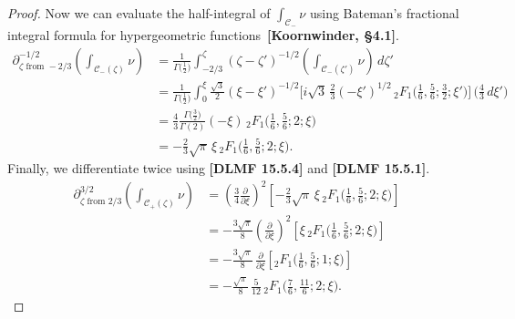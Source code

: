 \documentclass{article}
\theoremstyle{definition}
\begin{document}
\begin{proof}
Now we can evaluate the half-integral of $\int_{\mathcal{C}_-} \nu$ using Bateman's fractional integral formula for hypergeometric functions~\textbf{[Koornwinder, \S 4.1]}.
\begin{align*}
\partial^{-1/2}_{\zeta \text{ from } -2/3} \left( \int_{\mathcal{C}_-(\zeta)} \nu \right) & = \frac{1}{\Gamma\big(\tfrac{1}{2}\big)} \int_{-2/3}^\zeta (\zeta - \zeta')^{-1/2} \left( \int_{\mathcal{C}_-(\zeta')} \nu \right)\,d\zeta' \\
& = \frac{1}{\Gamma\big(\tfrac{1}{2}\big)} \int_0^\xi \tfrac{\sqrt{3}}{2} (\xi - \xi')^{-1/2} \Big[{i}{\sqrt{3}}\,\tfrac{2}{3} (-\xi')^{1/2}\, {}_2F_1\big(\tfrac{1}{6}, \tfrac{5}{6}; \tfrac{3}{2}; \xi' \big) \Big] \,\big( \tfrac{4}{3}\,d\xi' \big) \\
& =  \frac{4}{3} \frac{\Gamma\big(\tfrac{3}{2}\big)}{\Gamma(2)} (-\xi)\, {}_2F_1\big(\tfrac{1}{6}, \tfrac{5}{6}; 2; \xi\big) \\
& = - \frac{2}{3} \sqrt{\pi}\,\xi\,{}_2F_1\big(\tfrac{1}{6}, \tfrac{5}{6}; 2; \xi\big).
\end{align*}
Finally, we differentiate twice using \textbf{[DLMF 15.5.4]} and \textbf{[DLMF 15.5.1]}.
\begin{align*}
\partial^{3/2}_{\zeta \text{ from } 2/3} \left( \int_{\mathcal{C}_+(\zeta)} \nu \right) & = \left(\tfrac{3}{4} \tfrac{\partial}{\partial \xi}\right)^2 \left[ - \frac{2}{3} \sqrt{\pi}\,\xi\, {}_2F_1\big(\tfrac{1}{6}, \tfrac{5}{6}; 2; \xi\big) \right] \\
& = - \tfrac{3\sqrt{\pi}}{8} \left(\tfrac{\partial}{\partial \xi}\right)^2 \left[ \xi\, {}_2F_1\big(\tfrac{1}{6}, \tfrac{5}{6}; 2; \xi\big) \right] \\
& = - \tfrac{3\sqrt{\pi}}{8}\,\tfrac{\partial}{\partial \xi} \left[ {}_2F_1\big(\tfrac{1}{6}, \tfrac{5}{6}; 1; \xi\big) \right] \\
& = - \tfrac{\sqrt{\pi}}{8}\,\tfrac{5}{12}\, {}_2F_1\big(\tfrac{7}{6}, \tfrac{11}{6}; 2; \xi\big).
\end{align*}
\end{proof}



\end{document}
